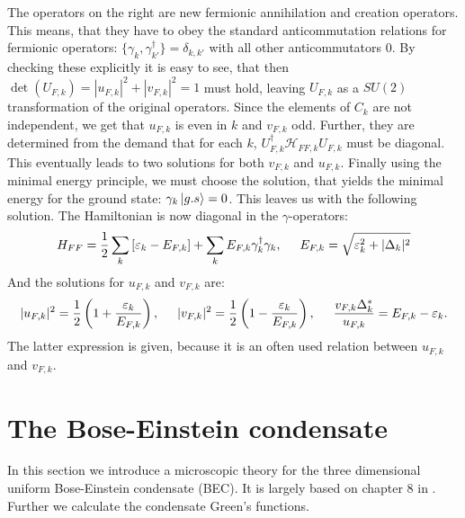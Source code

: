 The operators on the right are new fermionic annihilation and creation operators. This means, that they have to obey the standard anticommutation relations for fermionic operators: $\{\gamma_k,\gamma_{k'}^\dagger \} = \delta_{k,k'}$ with all other anticommutators 0. By checking these explicitly it is easy to see, that then $\det(U_{F,k}) = |u_{F,k}|^2+|v_{F,k}|^2 = 1$ must hold, leaving $U_{F,k}$ as a $SU(2)$ transformation of the original operators. Since the elements of $C_k$ are not independent, we get that $u_{F,k}$ is even in $k$ and $v_{F,k}$ odd. Further, they are determined from the demand that for each $k$, $U^\dagger_{F,k} \mathcal{H}_{FF,k}U_{F,k}$ must be diagonal. This eventually leads to two solutions for both $v_{F,k}$ and $u_{F,k}$. Finally using the minimal energy principle, we must choose the solution, that yields the minimal energy for the ground state: $\gamma_k\ket{g.s} = 0$. This leaves us with the following solution. The Hamiltonian is now diagonal in the $\gamma$-operators: 
\begin{equation}
H_{FF} = \frac{1}{2}\sum_k \left[\varepsilon_k-E_{F,k}\right] + \sum_k E_{F,k} \gamma^\dagger_k \gamma_k, \hspace{0.5cm} E_{F,k} = \sqrt{\varepsilon_k^2 + |\Delta_k|^2}
\label{eq.Kitaev.H_diagonalpre}
\end{equation}
And the solutions for $u_{F,k}$ and $v_{F,k}$ are: 
\begin{equation}
|u_{F,k}|^2 = \frac{1}{2}\left(1 + \frac{\varepsilon_k}{E_{F,k}}\right), \hspace{0.5cm} |v_{F,k}|^2 = \frac{1}{2}\left(1-\frac{\varepsilon_k}{E_{F,k}}\right), \hspace{0.5cm} \frac{v_{F,k}\Delta^*_k}{u_{F,k}}=E_{F,k}-\varepsilon_k.
\label{eq.Kitaev.uk_vk}
\end{equation}
The latter expression is given, because it is an often used relation between $u_{F,k}$ and $v_{F,k}$. 


\section{The Bose-Einstein condensate}
In this section we introduce a microscopic theory for the three dimensional uniform Bose-Einstein condensate (BEC). It is largely based on chapter 8 in \cite{Pethick}. Further we calculate the condensate Green's functions. 

